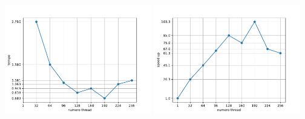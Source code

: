 \documentclass[12pt,openany]{report}
\begin{document}
\begin{center}
    \includegraphics[width=0.48\textwidth ]{images/tempi_MPI.pdf}
    \includegraphics[width=0.48\textwidth ]{images/speedup_MPI.pdf}
\end{center}
\end{document}
